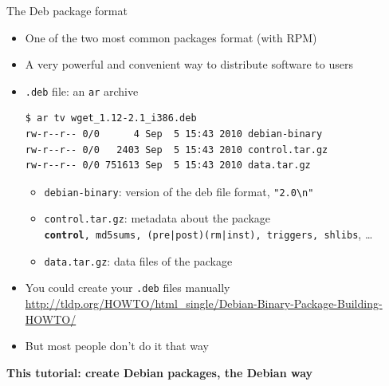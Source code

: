 \documentclass[10pt,final]{beamer}
\begin{document}
\begin{frame}[fragile]{The Deb package format}
  \begin{itemize}
  \item One of the two most common packages format (with RPM)
  \item A very powerful and convenient way to distribute software to users
  \item \texttt{.deb} file: an \texttt{ar} archive
    \begin{lstlisting}[basicstyle=\ttfamily\footnotesize]
$ ar tv wget_1.12-2.1_i386.deb
rw-r--r-- 0/0      4 Sep  5 15:43 2010 debian-binary
rw-r--r-- 0/0   2403 Sep  5 15:43 2010 control.tar.gz
rw-r--r-- 0/0 751613 Sep  5 15:43 2010 data.tar.gz
    \end{lstlisting} %
    \begin{itemize}
    \item \texttt{debian-binary}: version of the deb file format, \texttt{"2.0\textbackslash{}n"}
    \item \texttt{control.tar.gz}: metadata about the package\\
      {\small \texttt{\textbf{control}, md5sums, (pre|post)(rm|inst), triggers, shlibs}, \ldots}
    \item \texttt{data.tar.gz}: data files of the package
    \end{itemize}
  \item You could create your \texttt{.deb} files manually\\
    {\footnotesize \url{http://tldp.org/HOWTO/html\_single/Debian-Binary-Package-Building-HOWTO/}}
  \item But most people don't do it that way
  \end{itemize}
  \hbr
  \centerline{\textbf{This tutorial: create Debian packages, the Debian way}}
\end{frame}
\end{document}
